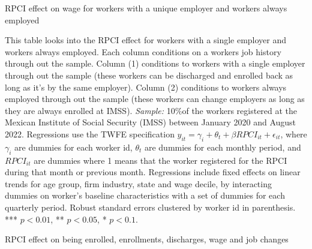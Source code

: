 \documentclass[oneside,11pt]{article}
\begin{document}
\clearpage

\begin{table}[H]
    \caption{RPCI effect on wage for workers with a unique employer and workers always employed}
    \label{twfe_wage_same_idrfc}
    \begin{center}
    \scriptsize{}
    \end{center}
\end{table}

\scriptsize{
\noindent This table looks into the RPCI effect for workers with a single employer and workers always employed. Each column conditions on a workers job history through out the sample. Column (1) conditions to workers with a single employer through out the sample (these workers can be discharged and enrolled back as long as it's by the same employer). Column (2) conditions to workers always employed through out the sample (these workers can change employers as long as they are always enrolled at IMSS). \textit{Sample:} 10\%of the workers registered at the Mexican Institute of Social Security (IMSS) between January 2020 and August 2022. Regressions use the TWFE specification $y_{it} = \gamma_{i} + \theta_{t}+ \beta RPCI_{it} +\epsilon_{it}$, where $\gamma_{i}$ are dummies for each worker id, $\theta_{t}$ are dummies for each monthly period, and $RPCI_{it}$ are dummies where 1 means that the worker registered for the RPCI during that month or previous month. Regressions include fixed effects on linear trends for age group, firm industry, state and wage decile, by interacting dummies on worker's baseline characteristics with a set of dummies for each quarterly period. Robust standard errors clustered by worker id in parenthesis. *** $p<0.01$, ** $p<0.05$, * $p<0.1$.
}


\clearpage

\begin{table}[H]
    \caption{RPCI effect on being enrolled, enrollments, discharges, wage and job changes}
    \label{twfe_job}
    \begin{center}
    \scriptsize{}
    \end{center}
\end{table}
\end{document}

